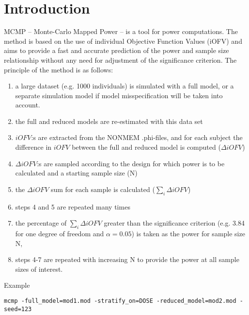 




\maketitle
\newcommand{\guidetoolname}{mcmp}


\section{Introduction}
MCMP – Monte-Carlo Mapped Power \cite{Vong}  – is a tool for power computations.
The method is based on the use of individual Objective Function Values (iOFV) 
and aims to provide a fast and accurate prediction of the power and sample size 
relationship without any need for adjustment of the significance criterion.
The principle of the method is as follows:
\begin{enumerate}
\item a large dataset (e.g. 1000 individuals) is simulated with a full model, or a separate simulation model if model misspecification will be taken into account.
\item the full and reduced models are re-estimated with this data set
\item $iOFV$:s are extracted from the NONMEM .phi-files, and for each subject the difference in $iOFV$ between the full and reduced model is computed ($\Delta iOFV$)
\item $\Delta iOFV$:s are sampled according to the design for which power is to be calculated and a starting sample size (N)
\item the $\Delta iOFV$ sum for each sample is calculated ($\sum_i{\Delta iOFV}$) 
\item steps 4 and 5 are repeated many times 
\item the percentage of $\sum_i{\Delta iOFV}$ greater than the significance criterion (e.g. 3.84 for one degree of freedom and $\alpha=0.05$) 
is taken as the power for sample size N, 
\item steps 4-7 are repeated with increasing N to provide the power at all sample sizes of interest.
\end{enumerate}

Example\\
\begin{verbatim}
mcmp -full_model=mod1.mod -stratify_on=DOSE -reduced_model=mod2.mod -seed=123
\end{verbatim}

